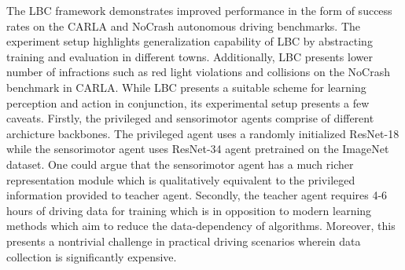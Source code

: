 \documentclass[11pt,letterpaper]{article}
\begin{document}
The LBC framework demonstrates improved performance in the form of success rates on the CARLA and NoCrash autonomous driving benchmarks. The experiment setup highlights generalization capability of LBC by abstracting training and evaluation in different towns. Additionally, LBC presents lower number of infractions such as red light violations and collisions on the NoCrash benchmark in CARLA. While LBC presents a suitable scheme for learning perception and action in conjunction, its experimental setup presents a few caveats. Firstly, the privileged and sensorimotor agents comprise of different archicture backbones. The privileged agent uses a randomly initialized ResNet-18 while the sensorimotor agent uses ResNet-34 agent pretrained on the ImageNet dataset. One could argue that the sensorimotor agent has a much richer representation module which is qualitatively equivalent to the privileged information provided to teacher agent. Secondly, the teacher agent requires 4-6 hours of driving data for training which is in opposition to modern learning methods which aim to reduce the data-dependency of algorithms. Moreover, this presents a nontrivial challenge in practical driving scenarios wherein data collection is significantly expensive. 
\end{document}
